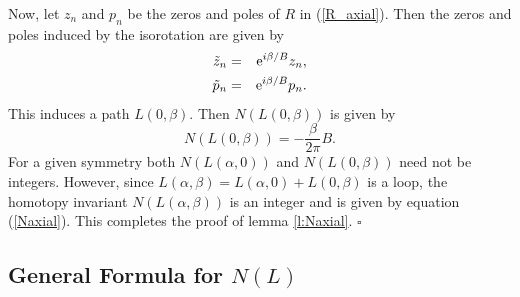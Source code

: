\documentclass[a4paper,12pt]{article}
\begin{document}
Now, let $z_n$ and $p_n$ be the zeros and poles of $R$ in 
(\ref{R_axial}). Then the zeros and poles induced by the 
isorotation are given by
%
\begin{eqnarray}
{\tilde z}_n &=& {\rm e}^{i \beta/B} z_n, \\
{\tilde p}_n &=& {\rm e}^{i \beta/B} p_n.
\end{eqnarray}
%
This induces a path $L(0, \beta)$. Then $N(L(0, \beta))$ is given 
by
%
\begin{equation}
N(L(0, \beta)) = -\frac{\beta}{2 \pi} B.
\end{equation}
%
For a given symmetry both $N(L(\alpha,0))$ and $N(L(0, \beta))$ need not 
be integers. However, since $L(\alpha, \beta) = L(\alpha, 0) + 
L(0, \beta)$ is a loop, the homotopy invariant $N(L(\alpha, \beta))$ 
is an integer and is given by equation (\ref{Naxial}).
%
This completes the proof of lemma \ref{l:Naxial}. \hfill $\square$\\

\subsection{General Formula for $N(L)$}
\end{document}
